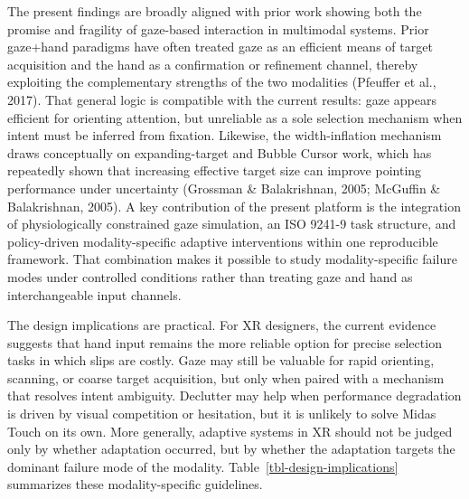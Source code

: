 \documentclass[
  11pt,
  11pt,
  letterpaper]{article}
\begin{document}
The present findings are broadly aligned with prior work showing both
the promise and fragility of gaze-based interaction in multimodal
systems. Prior gaze+hand paradigms have often treated gaze as an
efficient means of target acquisition and the hand as a confirmation or
refinement channel, thereby exploiting the complementary strengths of
the two modalities (Pfeuffer et al., 2017). That general logic is
compatible with the current results: gaze appears efficient for
orienting attention, but unreliable as a sole selection mechanism when
intent must be inferred from fixation. Likewise, the width-inflation
mechanism draws conceptually on expanding-target and Bubble Cursor work,
which has repeatedly shown that increasing effective target size can
improve pointing performance under uncertainty (Grossman \&
Balakrishnan, 2005; McGuffin \& Balakrishnan, 2005). A key contribution
of the present platform is the integration of physiologically
constrained gaze simulation, an ISO 9241-9 task structure, and
policy-driven modality-specific adaptive interventions within one
reproducible framework. That combination makes it possible to study
modality-specific failure modes under controlled conditions rather than
treating gaze and hand as interchangeable input channels.

The design implications are practical. For XR designers, the current
evidence suggests that hand input remains the more reliable option for
precise selection tasks in which slips are costly. Gaze may still be
valuable for rapid orienting, scanning, or coarse target acquisition,
but only when paired with a mechanism that resolves intent ambiguity.
Declutter may help when performance degradation is driven by visual
competition or hesitation, but it is unlikely to solve Midas Touch on
its own. More generally, adaptive systems in XR should not be judged
only by whether adaptation occurred, but by whether the adaptation
targets the dominant failure mode of the modality.
Table~\ref{tbl-design-implications} summarizes these modality-specific
guidelines.
\end{document}
